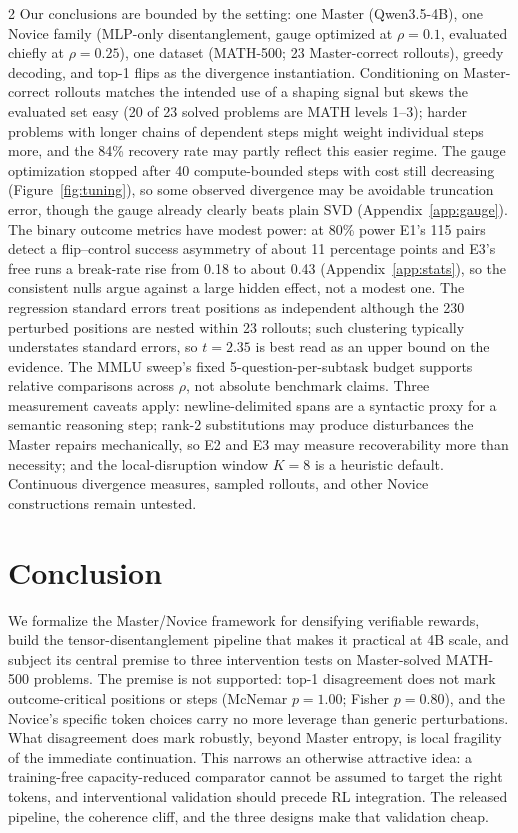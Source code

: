 \documentclass[9pt]{article}
\begin{document}
\begin{multicols}{2}
Our conclusions are bounded by the setting: one Master (Qwen3.5-4B), one
Novice family (MLP-only disentanglement, gauge optimized at $\rho{=}0.1$,
evaluated chiefly at $\rho{=}0.25$), one dataset (MATH-500; 23 Master-correct
rollouts), greedy decoding, and top-1 flips as the divergence instantiation.
Conditioning on Master-correct rollouts matches the intended use of a
shaping signal but skews the evaluated set easy (20 of 23 solved problems
are MATH levels 1--3); harder problems with longer chains of dependent steps
might weight individual steps more, and the 84\% recovery rate may partly
reflect this easier regime. The gauge optimization stopped after 40
compute-bounded steps with cost still decreasing (Figure~\ref{fig:tuning}), so
some observed divergence may be avoidable truncation error, though the gauge
already clearly beats plain SVD (Appendix~\ref{app:gauge}). The binary outcome
metrics have modest power: at 80\% power E1's 115 pairs detect a flip--control
success asymmetry of about 11 percentage points and E3's free runs a break-rate
rise from 0.18 to about 0.43 (Appendix~\ref{app:stats}), so the consistent
nulls argue against a large hidden effect, not a modest one. The regression
standard errors treat positions as independent although the 230 perturbed
positions are nested within 23 rollouts; such clustering typically understates
standard errors, so $t = 2.35$ is best read as an upper bound on the evidence.
The MMLU sweep's fixed 5-question-per-subtask budget supports relative
comparisons across $\rho$, not absolute benchmark claims. Three measurement
caveats apply: newline-delimited spans are a syntactic proxy for a semantic
reasoning step; rank-2 substitutions may produce disturbances the Master
repairs mechanically, so E2 and E3 may measure recoverability more than
necessity; and the local-disruption window $K{=}8$ is a heuristic default.
Continuous divergence measures, sampled rollouts, and other Novice
constructions remain untested.

\section{Conclusion}

We formalize the Master/Novice framework for densifying verifiable rewards,
build the tensor-disentanglement pipeline that makes it practical at 4B
scale, and subject its central premise to three intervention tests on
Master-solved MATH-500 problems. The premise is not supported: top-1
disagreement does not mark outcome-critical positions or steps (McNemar
$p{=}1.00$; Fisher $p{=}0.80$), and the Novice's specific token choices carry
no more leverage than generic perturbations. What disagreement
does mark robustly, beyond Master entropy, is local fragility of the immediate
continuation. This narrows an otherwise attractive idea: a training-free
capacity-reduced comparator cannot be assumed to target the right tokens, and
interventional validation should precede RL integration. The released
pipeline, the coherence cliff, and the three designs make that validation
cheap.


\end{multicols}
\end{document}
